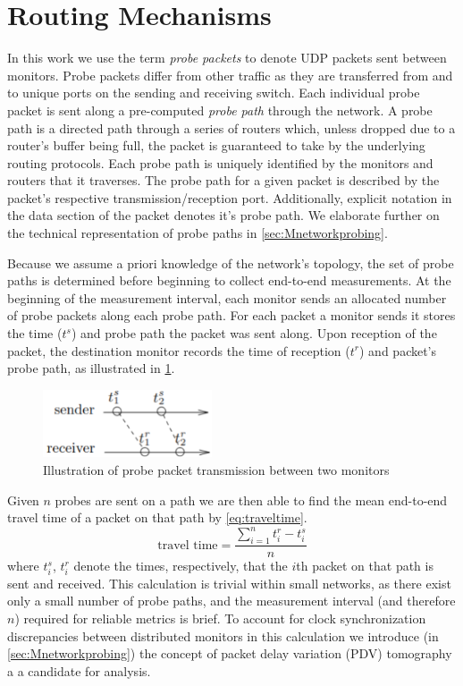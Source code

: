 \section{Routing Mechanisms}
\label{sec:Broutingmechanisms}

In this work we use the term \textit{probe packets} to denote UDP packets sent between monitors. Probe packets differ from other traffic as they are transferred from and to unique ports on the sending and receiving switch. Each individual probe packet is sent along a pre-computed \emph{probe path} through the network. A probe path is a directed path through a series of routers which, unless dropped due to a router's buffer being full, the packet is guaranteed to take by the underlying routing protocols. Each probe path is uniquely identified by the monitors and routers that it traverses. The probe path for a given packet is described by the packet's respective transmission/reception port. Additionally, explicit notation in the data section of the packet denotes it's probe path. We elaborate further on the technical representation of probe paths in \cref{sec:Mnetworkprobing}.\par
Because we assume a priori knowledge of the network's topology, the set of probe paths is determined before beginning to collect end-to-end measurements. At the beginning of the measurement interval, each monitor sends an allocated number of probe packets along each probe path. For each packet a monitor sends it stores the time ($t^s$) and probe path the packet was sent along. Upon reception of the packet, the destination monitor records the time of reception ($t^r$) and packet's probe path, as illustrated in \ref{fig:pptransmission}. 
\begin{figure}[H]
    \centering
    \includegraphics[width=5cm]{figs/background/probe_transmission.png}
    \caption[Illustration of probe packet transmission between two monitors]{Illustration of probe packet transmission between two monitors \protect\cite{he_fisher_2015}}
    \label{fig:pptransmission}
\end{figure}
\noindent Given $n$ probes are sent on a path we are then able to find the mean end-to-end travel time of a packet on that path by \cref{eq:traveltime}.
\begin{equation}
    \label{eq:traveltime}
    \text{travel time}=\frac{\sum_{i=1}^nt_i^r - t_i^s}{n}
\end{equation}
where $t_i^s$, $t_i^r$ denote the times, respectively, that the $i$th packet on that path is sent and received. This calculation is trivial within small networks, as there exist only a small number of probe paths, and the measurement interval (and therefore $n$) required for reliable metrics is brief. To account for clock synchronization discrepancies between distributed monitors in this calculation we introduce (in \cref{sec:Mnetworkprobing}) the concept of packet delay variation (PDV) tomography a a candidate for analysis.\par

